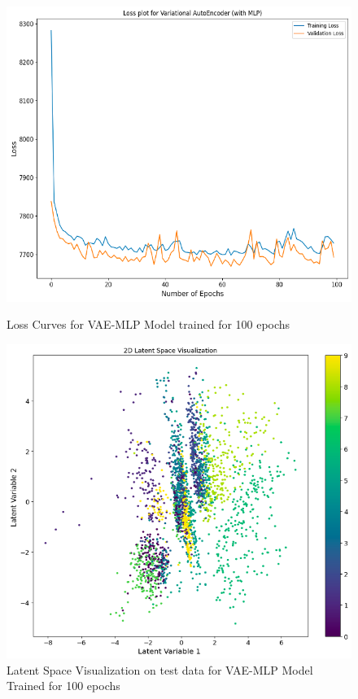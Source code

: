 \documentclass[12pt]{article}
\begin{document}
\begin{figure}[htbp]
    \centering
    \begin{minipage}[b]{0.45\linewidth}
        \centering
        \includegraphics[width=\linewidth]{100.png}
        \caption{Loss Curves for VAE-MLP Model trained for 100 epochs}
        \label{fig:gen_stft}
    \end{minipage}
    \hfill
    \begin{minipage}[b]{0.45\linewidth}
        \centering
        \includegraphics[width=\linewidth]{lat_100.png}
        \caption{Latent Space Visualization on test data for VAE-MLP Model Trained for 100 epochs}
        \label{fig:generated_audio}
    \end{minipage}
\end{figure}
\end{document}
